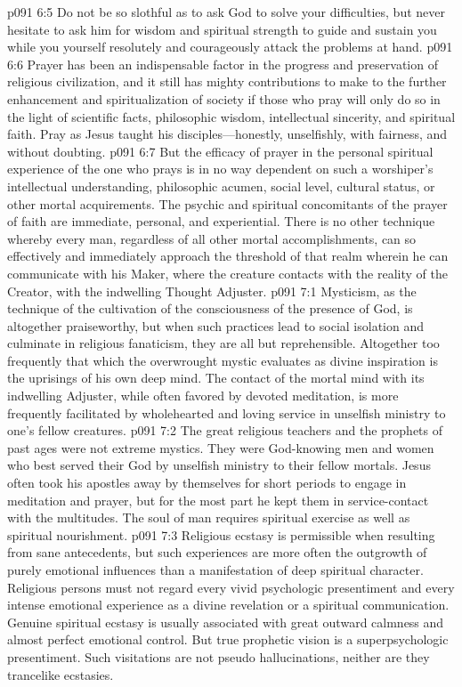 \pc \vs p091 6:5 Do not be so slothful as to ask God to solve your difficulties, but never hesitate to ask him for wisdom and spiritual strength to guide and sustain you while you yourself resolutely and courageously attack the problems at hand.
\pc \vs p091 6:6 Prayer has been an indispensable factor in the progress and preservation of religious civilization, and it still has mighty contributions to make to the further enhancement and spiritualization of society if those who pray will only do so in the light of scientific facts, philosophic wisdom, intellectual sincerity, and spiritual faith. Pray as Jesus taught his disciples---honestly, unselfishly, with fairness, and without doubting.
\vs p091 6:7 But the efficacy of prayer in the personal spiritual experience of the one who prays is in no way dependent on such a worshiper’s intellectual understanding, philosophic acumen, social level, cultural status, or other mortal acquirements. The psychic and spiritual concomitants of the prayer of faith are immediate, personal, and experiential. There is no other technique whereby every man, regardless of all other mortal accomplishments, can so effectively and immediately approach the threshold of that realm wherein he can communicate with his Maker, where the creature contacts with the reality of the Creator, with the indwelling Thought Adjuster.
\vs p091 7:1 Mysticism, as the technique of the cultivation of the consciousness of the presence of God, is altogether praiseworthy, but when such practices lead to social isolation and culminate in religious fanaticism, they are all but reprehensible. Altogether too frequently that which the overwrought mystic evaluates as divine inspiration is the uprisings of his own deep mind. The contact of the mortal mind with its indwelling Adjuster, while often favored by devoted meditation, is more frequently facilitated by wholehearted and loving service in unselfish ministry to one’s fellow creatures.
\vs p091 7:2 The great religious teachers and the prophets of past ages were not extreme mystics. They were God\hyp{}knowing men and women who best served their God by unselfish ministry to their fellow mortals. Jesus often took his apostles away by themselves for short periods to engage in meditation and prayer, but for the most part he kept them in service\hyp{}contact with the multitudes. The soul of man requires spiritual exercise as well as spiritual nourishment.
\vs p091 7:3 Religious ecstasy is permissible when resulting from sane antecedents, but such experiences are more often the outgrowth of purely emotional influences than a manifestation of deep spiritual character. Religious persons must not regard every vivid psychologic presentiment and every intense emotional experience as a divine revelation or a spiritual communication. Genuine spiritual ecstasy is usually associated with great outward calmness and almost perfect emotional control. But true prophetic vision is a superpsychologic presentiment. Such visitations are not pseudo hallucinations, neither are they trancelike ecstasies.
